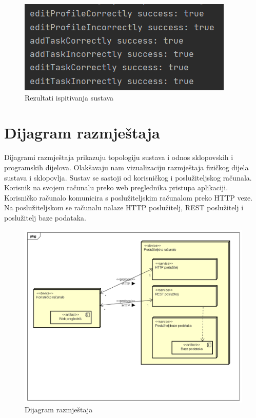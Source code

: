 		\begin{figure}[H] 
			\includegraphics[width=\textwidth]{slike/systemTestRezultati.png}
			\caption{Rezultati ispitivanja sustava}
		\end{figure}
			
			\eject 
		
		
		\section{Dijagram razmještaja}
			
			Dijagrami razmještaja prikazuju topologiju sustava i odnos sklopovskih i programskih dijelova. Olakšavaju nam vizualizaciju razmještaja fizičkog dijela sustava i sklopovlja. Sustav se sastoji od korisničkog i poslužiteljskog računala. Korisnik na svojem računalu preko web preglednika pristupa aplikaciji. Korisničko računalo komunicira s poslužiteljskim računalom preko HTTP veze. Na poslužiteljskom se računalu nalaze HTTP poslužitelj, REST poslužitelj i poslužitelj baze podataka. 
			
			\begin{figure}[H]
				\includegraphics[width=\textwidth]{slike/dijagram_razmjestaja.png}
				\centering
				\caption{Dijagram razmještaja}
				\label{fig:dijagram_razmjestaja}
			\end{figure}
			
